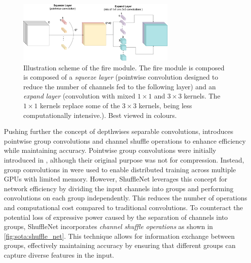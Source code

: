 \begin{figure}[htbp]
    \centering
    \includegraphics[width=0.70\textwidth]{chapter_sota/assets/fire_module.pdf}
    \caption{Illustration scheme of the fire module. The fire module is composed
    is composed of a \emph{squeeze layer} (pointwise convolution designed to
    reduce the number of channels fed to the following layer) and an
    \emph{expand layer} (convolution with mixed $1\times1$ and $3\times3$
    kernels. The $1\times1$ kernels replace some of the $3\times3$ kernels,
    being less computationally intensive.). Best viewed in colours.}
    \label{fig:sota:fire_module}
\end{figure}



Pushing further the concept of depthwises separable convolutions,
\cite{ZhangShuffleNet} introduces pointwise group convolutions and channel
shuffle operations to enhance efficiency while maintaining accuracy. Pointwise
group convolutions were initially introduced in
\cite{DBLP:conf/nips/KrizhevskySH12}, although their original purpose was not
for compression. Instead, group convolutions in
\cite{DBLP:conf/nips/KrizhevskySH12} were used to enable distributed training
across multiple \acp{GPU} with limited memory. However, ShuffleNet
\cite{ZhangShuffleNet} leverages this concept for network efficiency by dividing
the input channels into groups and performing convolutions on each group
independently. This reduces the number of operations and computational cost
compared to traditional convolutions. To counteract the potential loss of
expressive power caused by the separation of channels into groups, ShuffleNet
incorporates \emph{channel shuffle operations} as shown in
\cref{fig:sota:shuffle_net}. This technique allows for information exchange
between groups, effectively maintaining accuracy by ensuring that different
groups can capture diverse features in the input.\\

